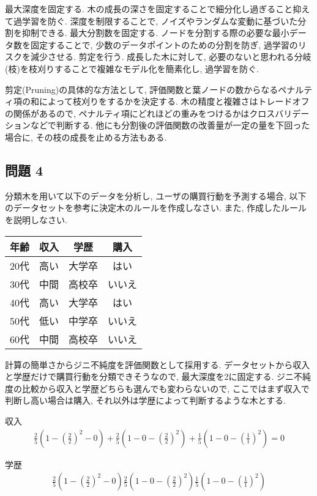\documentclass[dvipdfmx, 10pt]{jsarticle}
\begin{document}
最大深度を固定する. 木の成長の深さを固定することで細分化し過ぎること抑えて過学習を防ぐ. 
深度を制限することで, ノイズやランダムな変動に基づいた分割を抑制できる. 
最大分割数を固定する. ノードを分割する際の必要な最小データ数を固定することで, 
少数のデータポイントのための分割を防ぎ, 過学習のリスクを減少させる. 
剪定を行う. 成長した木に対して, 必要のないと思われる分岐(枝)を枝刈りすることで複雑なモデル化を簡素化し, 過学習を防ぐ. 

剪定(Pruning)の具体的な方法として, 評価関数と葉ノードの数からなるペナルティ項の和によって枝刈りをするかを決定する. 
木の精度と複雑さはトレードオフの関係があるので, ペナルティ項にどれほどの重みをつけるかはクロスバリデーションなどで判断する.
他にも分割後の評価関数の改善量が一定の量を下回った場合に, その枝の成長を止める方法もある. 

\subsection*{問題 4}
分類木を用いて以下のデータを分析し, ユーザの購買行動を予測する場合, 以下のデータセットを参考に決定木のルールを作成しなさい. また, 作成したルールを説明しなさい. 

\begin{table}[H]
    \centering
    \begin{tabular}{|c|c|c|c|}
        \hline
        年齢 & 収入 & 学歴 & 購入 \\
        \hline
        20代 & 高い & 大学卒 & はい \\
        30代 & 中間 & 高校卒 & いいえ \\
        40代 & 高い & 大学卒 & はい \\
        50代 & 低い & 中学卒 & いいえ \\
        60代 & 中間 & 高校卒 & いいえ \\
        \hline
    \end{tabular}
\end{table}

計算の簡単さからジニ不純度を評価関数として採用する. 
データセットから収入と学歴だけで購買行動を分類できそうなので, 最大深度を2に固定する. 
ジニ不純度の比較から収入と学歴どちらも選んでも変わらないので, 
ここではまず収入で判断し高い場合は購入, それ以外は学歴によって判断するような木とする. 

収入
\begin{align*}
    \frac{2}{5}(1 - (\frac{2}{2})^2 - 0) +
    \frac{2}{5}(1 - 0 - (\frac{2}{2})^2) +
    \frac{1}{5}(1 - 0 - (\frac{1}{1})^2) = 0
\end{align*}

学歴
\begin{align*}
    \frac{2}{5}(1 - (\frac{2}{2})^2 - 0)
    \frac{2}{5}(1 - 0 - (\frac{2}{2})^2)
    \frac{1}{5}(1 - 0 - (\frac{1}{1})^2)
\end{align*}
\end{document}
